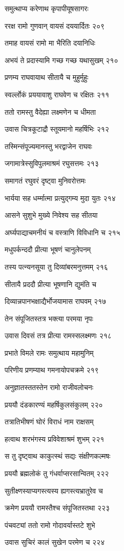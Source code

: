 समुत्थाप्य करेणाथ कृपापीयूषसागरः

ररक्ष रामो गुणवान् वायसं दययार्दितः २०९

तमाह वायसं रामो मा भैरिति दयानिधिः

अभयं ते प्रदास्यामि गच्छ गच्छ यथासुखम् २१०

प्रणम्य राघवायाथ सीतायै च मुहुर्मुहुः

स्वर्ल्लोकं प्रययावाशु राघवेण च रक्षितः २११

ततो रामस्तु वैदेह्या लक्ष्मणेन च धीमता

उवास चित्रकूटाद्रौ स्तूयमानो महर्षिभिः २१२

तस्मिन्संपूज्यमानस्तु भरद्वाजेन राघवः

जगामात्रेस्सुविपुलमाश्रमं रघुसत्तमः २१३

समागतं रघुवरं दृष्ट्वा मुनिवरोत्तमः

भार्यया सह धर्म्मात्मा प्रत्युद्गम्य मुदा युतः २१४

आसने सुशुभे मुख्ये निवेश्य सह सीतया

अर्घ्यपाद्याचमनीयं च वस्त्राणि विविधानि च २१५

मधुपर्कन्ददौ प्रीत्या भूषणं चानुलेपनम्

तस्य पत्न्यनसूया तु दिव्यांबरमनुत्तमम् २१६

सीतायै प्रददौ प्रीत्या भूषणानि द्युमंति च

दिव्यान्नपानभक्षाद्यैर्भोजयामास राघवम् २१७

तेन संपूजितस्तत्र भक्त्या परमया नृपः

उवास दिवसं तत्र प्रीत्या रामस्सलक्ष्मणः २१८

प्रभाते विमले रामः समुत्थाय महामुनिम्

परिणीय प्रणम्याथ गमनायोपचक्रमे २१९

अनुज्ञातस्ततस्तेन रामो राजीवलोचनः

प्रययौ दंडकारण्यं महर्षिकुलसंकुलम् २२०

तत्रातिभीषणं घोरं विराधं नाम राक्षसम्

हत्वाथ शरभंगस्य प्रविवेशाश्रमं शुभम् २२१

स तु दृष्ट्वाथ काकुत्स्थं सद्यः संक्षीणकल्मषः

प्रययौ ब्रह्मलोकं तु गंधर्वाप्सरसान्वितम् २२२

सुतीक्ष्णस्याप्यगस्त्यस्य ह्यगस्त्यभ्रातुरेव च

क्रमेण प्रययौ रामस्तैश्च संपूजितस्तथा २२३

पंचवट्यां ततो रामो गोदावर्यास्तटे शुभे

उवास सुचिरं कालं सुखेन परमेण च २२४

